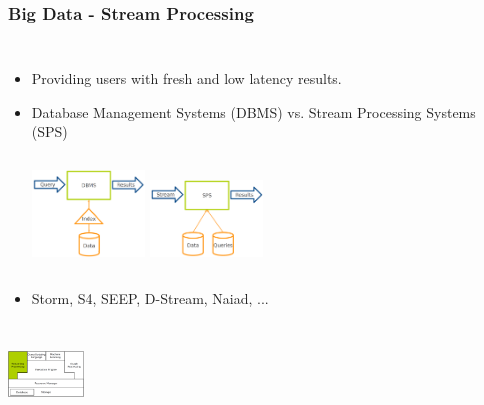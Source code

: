 \documentclass{beamer}
\begin{document}
\begin{frame}
\frametitle{Big Data - Stream Processing}
\begin{columns}
\column{30em}
\begin{itemize}\itemsep1em
  \justifying
  \item Providing users with \textcolor{Ocean}{fresh} and \textcolor{Ocean}{low latency} results.
  \item Database Management Systems (\textcolor{TextGreen}{DBMS}) vs. Stream Processing Systems (\textcolor{TextGreen}{SPS})
  \vspace{0.3cm}
  \begin{columns}[c] 
  \includegraphics[width=3cm,valign=t]{figs/dbms.pdf}
  \includegraphics[width=3cm,valign=t]{figs/sps.pdf}
  \end{columns}
  \item Storm, S4, SEEP, D-Stream, Naiad, ...
\end{itemize}
\end{columns}
\vspace{0.62cm}
\hspace*{10cm}\includegraphics[width=2cm]{figs/stack_streaming.pdf}
\end{frame}
\end{document}
